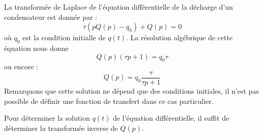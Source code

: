 La transformée de Laplace de l'équation différentielle de la décharge d'un
condensateur est donnée par :
\[
    \tau(pQ(p)-q_0)+Q(p)=0
\]
où $q_0$ est la condition initialle de $q(t)$.
La résolution algébrique de cette équation nous donne 
\[
    Q(p)(\tau p+1)=q_0\tau
\]
ou encore :
\[
    Q(p)=q_0\dfrac{\tau}{\tau p+1}
\]
Remarquons que cette solution ne dépend que des conditions initiales, il n'est 
pas possible de définir une fonction de transfert dans ce cas particulier.

Pour déterminer la solution $q(t)$ de l'équation différentielle, il suffit de 
déterminer la transformée inverse de $Q(p)$.

